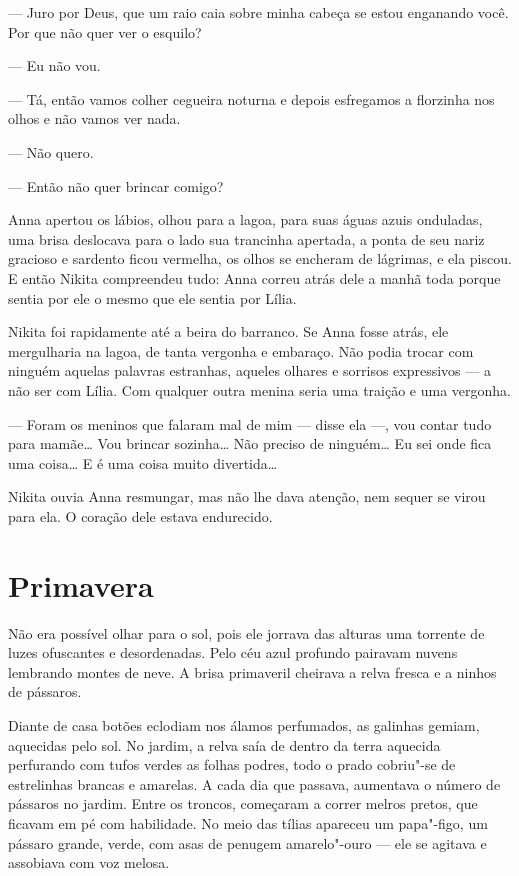 --- Juro por Deus, que um raio caia sobre minha cabeça se estou
enganando você. Por que não quer ver o esquilo?

--- Eu não vou.

--- Tá, então vamos colher cegueira noturna e depois esfregamos a
florzinha nos olhos e não vamos ver nada.

--- Não quero.

--- Então não quer brincar comigo?

Anna apertou os lábios, olhou para a lagoa, para suas águas azuis
onduladas, uma brisa deslocava para o lado sua trancinha apertada, a
ponta de seu nariz gracioso e sardento ficou vermelha, os olhos se
encheram de lágrimas, e ela piscou. E então Nikita compreendeu tudo:
Anna correu atrás dele a manhã toda porque sentia por ele o mesmo que
ele sentia por Lília.

Nikita foi rapidamente até a beira do barranco. Se Anna fosse atrás, ele mergulharia na lagoa, de tanta vergonha e embaraço. Não podia
trocar com ninguém aquelas palavras estranhas, aqueles olhares e
sorrisos expressivos --- a não ser com Lília. Com qualquer outra menina
seria uma traição e uma vergonha.

--- Foram os meninos que falaram mal de mim --- disse ela ---, vou
contar tudo para mamãe\ldots{} Vou brincar sozinha\ldots{} Não preciso de
ninguém\ldots{} Eu sei onde fica uma coisa\ldots{} E é uma coisa muito
divertida\ldots{}

Nikita ouvia Anna resmungar, mas não lhe dava atenção, nem sequer se
virou para ela. O coração dele estava endurecido.

\chapter{Primavera}

Não era possível olhar para o sol, pois ele jorrava das alturas uma
torrente de luzes ofuscantes e desordenadas. Pelo céu azul profundo
pairavam nuvens lembrando montes de neve. A brisa primaveril cheirava a
relva fresca e a ninhos de pássaros.

Diante de casa botões eclodiam nos álamos perfumados, as galinhas
gemiam, aquecidas pelo sol. No jardim, a relva saía de dentro da terra
aquecida perfurando com tufos verdes as folhas podres, todo o prado
cobriu"-se de estrelinhas brancas e amarelas. A cada dia que passava,
aumentava o número de pássaros no jardim. Entre os troncos, começaram a
correr melros pretos, que ficavam em pé com habilidade. No meio das
tílias apareceu um papa"-figo, um pássaro grande, verde, com asas de
penugem amarelo"-ouro --- ele se agitava e assobiava com voz melosa.

